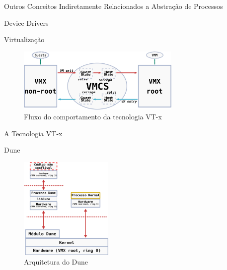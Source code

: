 \documentclass[xcolor={usenames,svgnames,dvipsnames},brazil,english,12pt,aspectratio=149]{beamer}
\begin{document}
\begin{frame}{Outros Conceitos Indiretamente Relacionados a Abstração de Processos}
\end{frame}

\begin{frame}{Device Drivers}
\end{frame}

\begin{frame}{Virtualização}
	\begin{figure}[!h]
		\centering
		\includegraphics[width=0.7\textwidth]{vt-x_flow} 
		\caption{Fluxo do comportamento da tecnologia VT-x}
		\label{fig:vt-x_flow}
	\end{figure}
\end{frame}

\begin{frame}{A Tecnologia VT-x}
\end{frame}


\begin{frame}{Dune}
	\begin{figure}[!h]
		\centering
		\includegraphics[width=0.4\textwidth]{dune_architecture} 
		\caption[Arquitetura do Dune]{Arquitetura do Dune}
		\label{fig:dune_architecture}
	\end{figure}
\end{frame}
\end{document}
